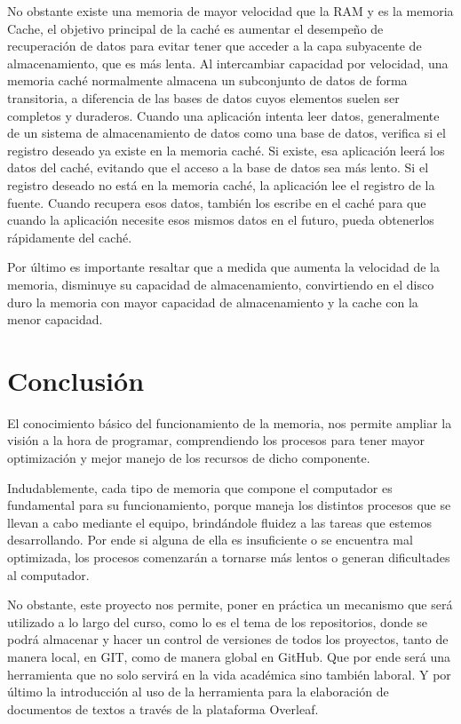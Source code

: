 \documentclass{article}
\begin{document}
\vspace{0.5cm}

No obstante existe una memoria  de mayor velocidad que la RAM y es la memoria Cache, el objetivo principal de la caché es aumentar el desempeño de recuperación de datos para evitar tener que acceder a la capa subyacente de almacenamiento, que es más lenta. Al intercambiar capacidad por velocidad, una memoria caché normalmente almacena un subconjunto de datos de forma transitoria, a diferencia de las bases de datos cuyos elementos suelen ser completos y duraderos. Cuando una aplicación intenta leer datos, generalmente de un sistema de almacenamiento de datos como una base de datos, verifica si el registro deseado ya existe en la memoria caché. Si existe, esa aplicación leerá los datos del caché, evitando que el acceso a la base de datos sea más lento. Si el registro deseado no está en la memoria caché, la aplicación lee el registro de la fuente. Cuando recupera esos datos, también los escribe en el caché para que cuando la aplicación necesite esos mismos datos en el futuro, pueda obtenerlos rápidamente del caché.

\vspace{0.5cm}

Por último es importante resaltar que a medida que aumenta la velocidad de la memoria, disminuye su capacidad de almacenamiento, convirtiendo en el disco duro la memoria  con mayor capacidad de almacenamiento y la cache con la menor capacidad.

\section{Conclusión}
El conocimiento básico del funcionamiento de la memoria, nos permite ampliar la visión a la hora de programar, comprendiendo los procesos para tener mayor optimización y mejor manejo de los recursos de dicho componente.

\vspace{0.5cm}

 Indudablemente, cada tipo de memoria que compone el computador  es fundamental para su funcionamiento, porque maneja los distintos procesos que se llevan a cabo mediante el equipo, brindándole fluidez a las tareas que estemos desarrollando. Por ende si alguna de ella es insuficiente o se encuentra mal optimizada, los procesos comenzarán a tornarse más lentos o generan dificultades al computador.
 
 \vspace{0.5cm}

No obstante, este proyecto nos permite, poner en práctica un mecanismo que será utilizado a lo largo del curso, como lo es el tema de los repositorios, donde se podrá almacenar y hacer un control de versiones de todos los proyectos, tanto de manera local, en GIT, como de manera global en GitHub. Que por ende será una herramienta que no solo servirá en la vida académica sino también laboral. Y por último la introducción al uso de la herramienta para la elaboración de documentos de textos a través de la plataforma Overleaf.

\vspace{0.5cm}




\end{document}
